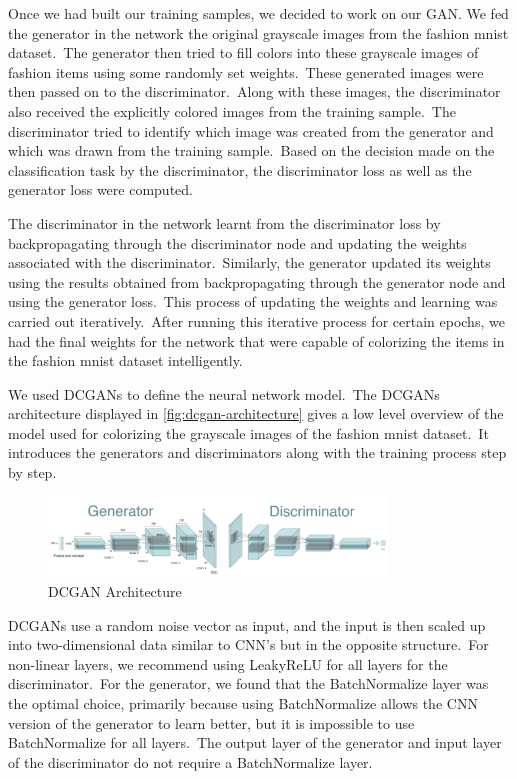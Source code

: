 \documentclass[conference]{IEEEtran}
\begin{document}
    Once we had built our training samples, we decided to work on our GAN. We fed the generator in the network the original grayscale images from the fashion mnist dataset.\ The generator then tried to fill colors into these grayscale images of fashion items using some randomly set weights.\ These generated images were then passed on to the discriminator.\ Along with these images, the discriminator also received the explicitly colored images from the training sample.\ The discriminator tried to identify which image was created from the generator and which was drawn from the training sample.\ Based on the decision made on the classification task by the discriminator, the discriminator loss as well as the generator loss were computed.

    The discriminator in the network learnt from the discriminator loss by backpropagating through the discriminator node and updating the weights associated with the discriminator.\ Similarly, the generator updated its weights using the results obtained from backpropagating through the generator node and using the generator loss.\ This process of updating the weights and learning was carried out iteratively.\ After running this iterative process for certain epochs, we had the final weights for the network that were capable of colorizing the items in the fashion mnist dataset intelligently.

    We used DCGANs to define the neural network model.\ The DCGANs architecture displayed in \autoref{fig:dcgan-architecture} gives a low level overview of the model used for colorizing the grayscale images of the fashion mnist dataset.\ It introduces the generators and discriminators along with the training process step by step.

    \begin{figure}
        \caption{DCGAN Architecture}
        \label{fig:dcgan-architecture}
        \includegraphics[width=9cm]{architecture.png}
        \centering
    \end{figure}

    DCGANs use a random noise vector as input, and the input is then scaled up into two-dimensional data similar to CNN's but in the opposite structure.\ For non-linear layers, we recommend using LeakyReLU for all layers for the discriminator.\ For the generator, we found that the BatchNormalize layer was the optimal choice, primarily because using BatchNormalize allows the CNN version of the generator to learn better, but it is impossible to use BatchNormalize for all layers.\ The output layer of the generator and input layer of the discriminator do not require a BatchNormalize layer.\
\end{document}
